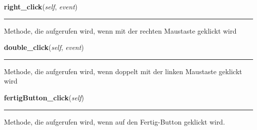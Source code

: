     \label{Main:main:mainGUI:right_click}

    \vspace{0.5ex}

\hspace{.8\funcindent}\begin{boxedminipage}{\funcwidth}

    \raggedright \textbf{right\_click}(\textit{self}, \textit{event})

    \vspace{-1.5ex}

    \rule{\textwidth}{0.5\fboxrule}
\setlength{\parskip}{2ex}
    Methode, die aufgerufen wird, wenn mit der rechten Maustaste geklickt 
    wird

\setlength{\parskip}{1ex}
    \end{boxedminipage}

    \label{Main:main:mainGUI:double_click}

    \vspace{0.5ex}

\hspace{.8\funcindent}\begin{boxedminipage}{\funcwidth}

    \raggedright \textbf{double\_click}(\textit{self}, \textit{event})

    \vspace{-1.5ex}

    \rule{\textwidth}{0.5\fboxrule}
\setlength{\parskip}{2ex}
    Methode, die aufgerufen wird, wenn doppelt mit der linken Maustaste 
    geklickt wird

\setlength{\parskip}{1ex}
    \end{boxedminipage}

    \label{Main:main:mainGUI:fertigButton_click}

    \vspace{0.5ex}

\hspace{.8\funcindent}\begin{boxedminipage}{\funcwidth}

    \raggedright \textbf{fertigButton\_click}(\textit{self})

    \vspace{-1.5ex}

    \rule{\textwidth}{0.5\fboxrule}
\setlength{\parskip}{2ex}
    Methode, die aufgerufen wird, wenn auf den Fertig-Button geklickt wird.

\setlength{\parskip}{1ex}
    \end{boxedminipage}

